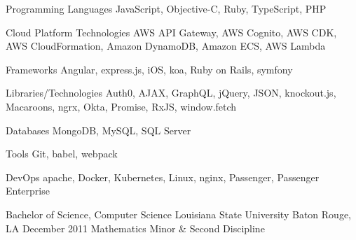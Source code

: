 \documentclass[letterpaper]{awesome-cv}
\begin{document}
\begin{cventries}
\end{cventries}

\begin{cvskills}
  \cvskill
    {Programming Languages}
    {JavaScript, Objective-C, Ruby, TypeScript, PHP}

  \cvskill
    {Cloud Platform Technologies}
    {AWS API Gateway, AWS Cognito, AWS CDK, AWS CloudFormation, Amazon DynamoDB, Amazon ECS, AWS Lambda}

  \cvskill
    {Frameworks}
    {Angular, express.js, iOS, koa, Ruby on Rails, symfony}

  \cvskill
    {Libraries/Technologies}
    {Auth0, AJAX, GraphQL, jQuery, JSON, knockout.js, Macaroons, ngrx, Okta, Promise, RxJS, window.fetch}

  \cvskill
    {Databases}
    {MongoDB, MySQL, SQL Server}

  \cvskill
    {Tools}
    {Git, babel, webpack}

  \cvskill
    {DevOps}
    {apache, Docker, Kubernetes, Linux, nginx, Passenger, Passenger Enterprise}
\end{cvskills}

\begin{cventries}
  \cventry
    {Bachelor of Science, Computer Science}
    {Louisiana State University}
    {Baton Rouge, LA}
    {December 2011}
    {Mathematics Minor \& Second Discipline}
\end{cventries}
\end{document}
